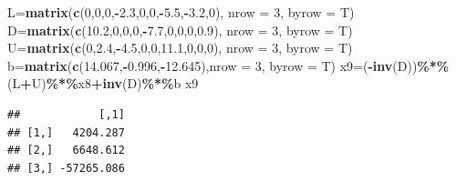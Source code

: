 \documentclass[
]{article}
\newenvironment{Shaded}{\begin{snugshade}}{\end{snugshade}}
\newcommand{\AttributeTok}[1]{\textcolor[rgb]{0.13,0.29,0.53}{#1}}
\newcommand{\DecValTok}[1]{\textcolor[rgb]{0.00,0.00,0.81}{#1}}
\newcommand{\FloatTok}[1]{\textcolor[rgb]{0.00,0.00,0.81}{#1}}
\newcommand{\FunctionTok}[1]{\textcolor[rgb]{0.13,0.29,0.53}{\textbf{#1}}}
\newcommand{\NormalTok}[1]{#1}
\newcommand{\OtherTok}[1]{\textcolor[rgb]{0.56,0.35,0.01}{#1}}
\newcommand{\SpecialCharTok}[1]{\textcolor[rgb]{0.81,0.36,0.00}{\textbf{#1}}}
\begin{document}
\begin{Shaded}
\begin{Highlighting}[]
\NormalTok{  L}\OtherTok{=}\FunctionTok{matrix}\NormalTok{(}\FunctionTok{c}\NormalTok{(}\DecValTok{0}\NormalTok{,}\DecValTok{0}\NormalTok{,}\DecValTok{0}\NormalTok{,}\SpecialCharTok{{-}}\FloatTok{2.3}\NormalTok{,}\DecValTok{0}\NormalTok{,}\DecValTok{0}\NormalTok{,}\SpecialCharTok{{-}}\FloatTok{5.5}\NormalTok{,}\SpecialCharTok{{-}}\FloatTok{3.2}\NormalTok{,}\DecValTok{0}\NormalTok{), }\AttributeTok{nrow =} \DecValTok{3}\NormalTok{, }\AttributeTok{byrow =}\NormalTok{ T)}
\NormalTok{  D}\OtherTok{=}\FunctionTok{matrix}\NormalTok{(}\FunctionTok{c}\NormalTok{(}\FloatTok{10.2}\NormalTok{,}\DecValTok{0}\NormalTok{,}\DecValTok{0}\NormalTok{,}\DecValTok{0}\NormalTok{,}\SpecialCharTok{{-}}\FloatTok{7.7}\NormalTok{,}\DecValTok{0}\NormalTok{,}\DecValTok{0}\NormalTok{,}\DecValTok{0}\NormalTok{,}\FloatTok{0.9}\NormalTok{), }\AttributeTok{nrow =} \DecValTok{3}\NormalTok{, }\AttributeTok{byrow =}\NormalTok{ T)}
\NormalTok{  U}\OtherTok{=}\FunctionTok{matrix}\NormalTok{(}\FunctionTok{c}\NormalTok{(}\DecValTok{0}\NormalTok{,}\FloatTok{2.4}\NormalTok{,}\SpecialCharTok{{-}}\FloatTok{4.5}\NormalTok{,}\DecValTok{0}\NormalTok{,}\DecValTok{0}\NormalTok{,}\FloatTok{11.1}\NormalTok{,}\DecValTok{0}\NormalTok{,}\DecValTok{0}\NormalTok{,}\DecValTok{0}\NormalTok{), }\AttributeTok{nrow =} \DecValTok{3}\NormalTok{, }\AttributeTok{byrow =}\NormalTok{ T)}
\NormalTok{  b}\OtherTok{=}\FunctionTok{matrix}\NormalTok{(}\FunctionTok{c}\NormalTok{(}\FloatTok{14.067}\NormalTok{,}\SpecialCharTok{{-}}\FloatTok{0.996}\NormalTok{,}\SpecialCharTok{{-}}\FloatTok{12.645}\NormalTok{),}\AttributeTok{nrow =} \DecValTok{3}\NormalTok{, }\AttributeTok{byrow =}\NormalTok{ T)}
\NormalTok{  x9}\OtherTok{=}\NormalTok{(}\SpecialCharTok{{-}}\FunctionTok{inv}\NormalTok{(D))}\SpecialCharTok{\%*\%}\NormalTok{(L}\SpecialCharTok{+}\NormalTok{U)}\SpecialCharTok{\%*\%}\NormalTok{x8}\SpecialCharTok{+}\FunctionTok{inv}\NormalTok{(D)}\SpecialCharTok{\%*\%}\NormalTok{b}
\NormalTok{  x9}
\end{Highlighting}
\end{Shaded}

\begin{verbatim}
##            [,1]
## [1,]   4204.287
## [2,]   6648.612
## [3,] -57265.086
\end{verbatim}
\end{document}
